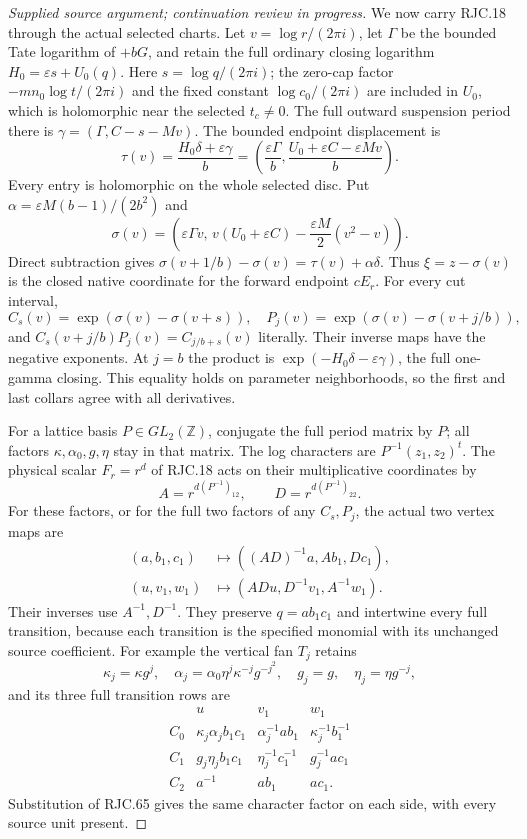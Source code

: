 \begin{proof}[Supplied source argument; continuation review in progress]
We now carry RJC.18 through the actual selected charts.
Let \(v=\log r/(2\pi i)\), let \(\Gamma\) be the bounded
Tate logarithm of \(+bG\), and retain the full ordinary
closing logarithm
\(H_0=\varepsilon s+U_0(q)\).
Here \(s=\log q/(2\pi i)\); the zero-cap factor
\(-mn_0\log t/(2\pi i)\) and the fixed constant
\(\log c_0/(2\pi i)\) are included in \(U_0\), which is
holomorphic near the selected \(t_c\ne0\).
The full outward suspension period there is
\(\gamma=(\Gamma,C-s-Mv)\).
The bounded endpoint displacement is
\[
 \tau(v)=\frac{H_0\delta+\varepsilon\gamma}{b}
 =\left(\frac{\varepsilon\Gamma}{b},
 \frac{U_0+\varepsilon C-\varepsilon Mv}{b}\right).
 \tag{RJC.62}
\]
Every entry is holomorphic on the whole selected disc.
Put \(\alpha=\varepsilon M(b-1)/(2b^2)\) and
\[
 \sigma(v)=
 \left(\varepsilon\Gamma v,\,
 v(U_0+\varepsilon C)
       -\frac{\varepsilon M}{2}(v^2-v)\right).
 \tag{RJC.63}
\]
Direct subtraction gives
\(\sigma(v+1/b)-\sigma(v)=\tau(v)+\alpha\delta\).
Thus \(\xi=z-\sigma(v)\) is the closed native coordinate
for the forward endpoint \(cE_r\).
For every cut interval,
\[
 C_s(v)=\exp(\sigma(v)-\sigma(v+s)),\quad
 P_j(v)=\exp(\sigma(v)-\sigma(v+j/b)),
 \tag{RJC.64}
\]
and \(C_s(v+j/b)P_j(v)=C_{j/b+s}(v)\) literally.
Their inverse maps have the negative exponents.
At \(j=b\) the product is
\(\exp(-H_0\delta-\varepsilon\gamma)\), the full
one-gamma closing. This equality holds on parameter
neighborhoods, so the first and last collars agree
with all derivatives.

For a lattice basis \(P\in GL_2(\mathbb Z)\), conjugate
the full period matrix by \(P\); all factors
\(\kappa,\alpha_0,g,\eta\) stay in that matrix.
The log characters are \(P^{-1}(z_1,z_2)^t\).
The physical scalar \(F_r=r^d\) of RJC.18 acts on
their multiplicative coordinates by
\[
 A=r^{d(P^{-1})_{12}},\qquad
 D=r^{d(P^{-1})_{22}}.
\]
For these factors, or for the full two factors
of any \(C_s,P_j\), the actual two vertex maps are
\[
 \begin{split}
 (a,b_1,c_1)&\longmapsto
 ((AD)^{-1}a,A b_1,D c_1),\\
 (u,v_1,w_1)&\longmapsto
 (ADu,D^{-1}v_1,A^{-1}w_1).
 \end{split}
 \tag{RJC.65}
\]
Their inverses use \(A^{-1},D^{-1}\). They preserve
\(q=ab_1c_1\) and intertwine every full transition,
because each transition is the specified monomial
with its unchanged source coefficient.
For example the vertical fan \(T_j\) retains
\[
 \kappa_j=\kappa g^j,\quad
 \alpha_j=\alpha_0\eta^j\kappa^{-j}g^{-j^2},\quad
 g_j=g,\quad\eta_j=\eta g^{-j},
 \tag{RJC.66}
\]
and its three full transition rows are
\[
 \begin{array}{c|ccc}
 &u&v_1&w_1\\ \hline
 C_0&\kappa_j\alpha_j b_1c_1&
       \alpha_j^{-1}ab_1&\kappa_j^{-1}b_1^{-1}\\
 C_1&g_j\eta_j b_1c_1&
       \eta_j^{-1}c_1^{-1}&g_j^{-1}ac_1\\
 C_2&a^{-1}&ab_1&ac_1.
 \end{array}
 \tag{RJC.67}
\]
Substitution of RJC.65 gives the same character
factor on each side, with every source unit present.


\end{proof}
